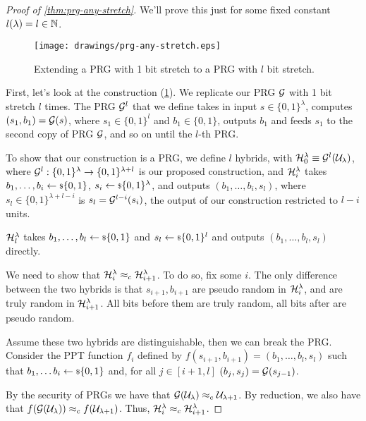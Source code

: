 \begin{proof}[Proof of \cref{thm:prg-any-stretch}]
	We'll prove this just for some fixed constant $l(\lambda) = l \in \mathbb{N}$.

	\begin{figure}
		\centering
		\texttt{[image: drawings/prg-any-stretch.eps]}
		\caption{Extending a \acs{PRG} with 1 bit stretch to a \acs{PRG} with $l$ bit stretch.}
		\label{fig:prg-any-stretch}
	\end{figure}

	First, let's look at the construction (\cref{fig:prg-any-stretch}).
	We replicate our \ac{PRG} $\mathcal{G}$ with 1 bit stretch $l$ times.
	The \ac{PRG} $\mathcal{G}^{l}$ that we define takes in input $s \in \{0,1\}^{\lambda}$, computes $(s_1, b_1) = \mathcal{G}(s)$, where $s_1 \in \{0,1\}^{l}$ and $b_1 \in \{0,1\}$, outputs $b_1$ and feeds $s_1$ to the second copy of \ac{PRG} $\mathcal{G}$, and so on until the $l$-th \ac{PRG}.

	To show that our construction is a \ac{PRG}, we define $l$ hybrids, with $\mathcal{H}_0^{\lambda} \equiv \mathcal{G}^{l}(\mathcal{U}_{\lambda})$, where $\mathcal{G}^{l} : \{0,1\}^{\lambda} \to \{0,1\}^{\lambda + l}$ is our proposed construction, and $\mathcal{H}_i^{\lambda}$ takes $b_1, \dots, b_i \leftarrow {\scriptstyle \$} {\{0,1\}}$, $s_i \leftarrow {\scriptstyle \$} {\{0,1\}^{\lambda}}$, and outputs $(b_1, \dots, b_i, s_l)$, where $s_l \in \{0,1\}^{\lambda + l - i}$ is $s_l = \mathcal{G}^{l-i}(s_i)$, \ie the output of our construction restricted to $l-i$ units.

	$\mathcal{H}_l^{\lambda}$ takes $b_1, \dots, b_l \leftarrow {\scriptstyle \$} {\{0,1\}}$ and $s_l \leftarrow {\scriptstyle \$} {\{0,1\}^{l}}$ and outputs $(b_1, \dots, b_l, s_l)$ directly.

	We need to show that $\mathcal{H}_i^{\lambda} \approx_c \mathcal{H}_{i+1}^{\lambda}$.
	To do so, fix some $i$.
	The only difference between the two hybrids is that $s_{i+1}, b_{i+1}$ are pseudo random in $\mathcal{H}_{i}^{\lambda}$, and are truly random in $\mathcal{H}_{i+1}^{\lambda}$.
	All bits before them are truly random, all bits after are pseudo random.

	Assume these two hybrids are distinguishable, then we can break the \ac{PRG}.
	Consider the \ac{PPT} function $f_i$ defined by $f(s_{i+1},b_{i+1}) = (b_1, \dots, b_l, s_l)$ such that $b_1, \dots b_i \leftarrow {\scriptstyle \$} {\{0,1\}}$ and, for all $j \in [i+1, l]$ $(b_j, s_j) = \mathcal{G}(s_{j-1})$.

	By the security of \acp{PRG} we have that $\mathcal{G}(\mathcal{U}_{\lambda}) \approx_c \mathcal{U}_{\lambda+1}$.
	By reduction, we also have that $f(\mathcal{G}(\mathcal{U}_{\lambda})) \approx_c f(\mathcal{U}_{\lambda+1})$.
	Thus, $\mathcal{H}_{i}^{\lambda} \approx_c \mathcal{H}_{i+1}^{\lambda}$.
\end{proof}

